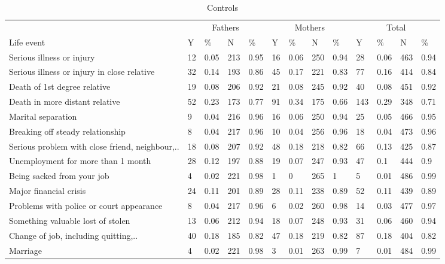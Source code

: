 \documentclass[]{article}
\begin{document}
\begin{table}[t]

\caption{\label{tab:unnamed-chunk-3}Controls}
\begin{tabular}{l|l|l|l|l|l|l|l|l|l|l|l|l}
\hline
\multicolumn{1}{c|}{ } & \multicolumn{4}{c|}{Fathers} & \multicolumn{4}{c|}{Mothers} & \multicolumn{4}{c}{Total} \\
\cline{2-5} \cline{6-9} \cline{10-13}
Life event & Y & \% & N & \% & Y & \% & N & \% & Y & \% & N & \%\\
\hline
Serious illness or injury & 12 & 0.05 & 213 & 0.95 & 16 & 0.06 & 250 & 0.94 & 28 & 0.06 & 463 & 0.94\\
\hline
Serious illness or injury in close relative & 32 & 0.14 & 193 & 0.86 & 45 & 0.17 & 221 & 0.83 & 77 & 0.16 & 414 & 0.84\\
\hline
Death of 1st degree relative & 19 & 0.08 & 206 & 0.92 & 21 & 0.08 & 245 & 0.92 & 40 & 0.08 & 451 & 0.92\\
\hline
Death in more distant relative & 52 & 0.23 & 173 & 0.77 & 91 & 0.34 & 175 & 0.66 & 143 & 0.29 & 348 & 0.71\\
\hline
Marital separation & 9 & 0.04 & 216 & 0.96 & 16 & 0.06 & 250 & 0.94 & 25 & 0.05 & 466 & 0.95\\
\hline
Breaking off steady relationship & 8 & 0.04 & 217 & 0.96 & 10 & 0.04 & 256 & 0.96 & 18 & 0.04 & 473 & 0.96\\
\hline
Serious problem with close friend, neighbour,.. & 18 & 0.08 & 207 & 0.92 & 48 & 0.18 & 218 & 0.82 & 66 & 0.13 & 425 & 0.87\\
\hline
Unemployment for more than 1 month & 28 & 0.12 & 197 & 0.88 & 19 & 0.07 & 247 & 0.93 & 47 & 0.1 & 444 & 0.9\\
\hline
Being sacked from your job & 4 & 0.02 & 221 & 0.98 & 1 & 0 & 265 & 1 & 5 & 0.01 & 486 & 0.99\\
\hline
Major financial crisis & 24 & 0.11 & 201 & 0.89 & 28 & 0.11 & 238 & 0.89 & 52 & 0.11 & 439 & 0.89\\
\hline
Problems with police or court appearance & 8 & 0.04 & 217 & 0.96 & 6 & 0.02 & 260 & 0.98 & 14 & 0.03 & 477 & 0.97\\
\hline
Something valuable lost of stolen & 13 & 0.06 & 212 & 0.94 & 18 & 0.07 & 248 & 0.93 & 31 & 0.06 & 460 & 0.94\\
\hline
Change of job, including quitting,.. & 40 & 0.18 & 185 & 0.82 & 47 & 0.18 & 219 & 0.82 & 87 & 0.18 & 404 & 0.82\\
\hline
Marriage & 4 & 0.02 & 221 & 0.98 & 3 & 0.01 & 263 & 0.99 & 7 & 0.01 & 484 & 0.99\\

\end{tabular}
\end{table}
\end{document}
